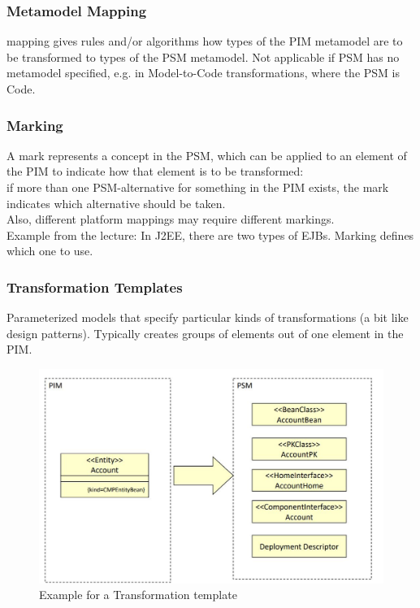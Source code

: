 			\subsubsection{Metamodel Mapping}
				mapping gives rules and/or algorithms how types of the PIM metamodel are to be transformed to
				types of the PSM metamodel. Not applicable if PSM has no metamodel specified, e.g. in Model-to-Code transformations, where the PSM is Code. \Biglb
		
			\subsubsection{Marking}
				A mark represents a concept in the PSM, which can be applied to an element of the PIM to indicate how that element is to be transformed: \\
				if more than one PSM-alternative for something in the PIM exists, the mark indicates which alternative should be taken.\\Also,	different platform mappings may require different markings. \\
				Example from the lecture: In J2EE, there are two types of EJBs. Marking defines which one to use.
				
			\subsubsection{Transformation Templates}
				Parameterized models that specify particular kinds of transformations (a bit like design patterns). Typically creates groups of elements out of one element in the PIM.
				\begin{figure}[h!]
					\includegraphics[scale=0.4]{res/mda-trans-templ.jpg}
					\caption{Example for a Transformation template}
				\end{figure}  	
		
